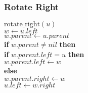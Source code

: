 \documentclass{beamer}
\newcommand{\eq}{=}
\begin{document}
\begin{frame}[shrink]
\frametitle{Rotate Right}
\begin{flushleft}
\hspace*{1em} \ensuremath{\mathrm{rotate\_right}(\ensuremath{\mathit{u}})}\\
\hspace*{1em} \hspace*{1em} \ensuremath{\ensuremath{\mathit{w}} \gets  \ensuremath{\ensuremath{\mathit{u}}.left}}\\
\hspace*{1em} \hspace*{1em} \ensuremath{\ensuremath{\mathit{w}}.\ensuremath{parent} \gets  \ensuremath{\ensuremath{\mathit{u}}.parent}}\\
\hspace*{1em} \hspace*{1em} {\color{black} \textbf{if}} \ensuremath{\ensuremath{\mathit{w}}.\ensuremath{\mathit{parent}} \ne nil} {\color{black} \textbf{then}} \\
\hspace*{1em} \hspace*{1em} \hspace*{1em} {\color{black} \textbf{if}} \ensuremath{\ensuremath{\mathit{w}}.\ensuremath{\mathit{parent}}.\ensuremath{\mathit{left}} \eq u} {\color{black} \textbf{then}} \\
\hspace*{1em} \hspace*{1em} \hspace*{1em} \hspace*{1em} \ensuremath{\ensuremath{\mathit{w}}.\ensuremath{\ensuremath{\mathit{parent}}.left} \gets  \ensuremath{w}}\\
\hspace*{1em} \hspace*{1em} \hspace*{1em} {\color{black} \textbf{else}} \\
\hspace*{1em} \hspace*{1em} \hspace*{1em} \hspace*{1em} \ensuremath{\ensuremath{\mathit{w}}.\ensuremath{\ensuremath{\mathit{parent}}.right} \gets  \ensuremath{w}}\\
\hspace*{1em} \hspace*{1em} \ensuremath{\ensuremath{\mathit{u}}.\ensuremath{left} \gets  \ensuremath{\ensuremath{\mathit{w}}.right}}\\

\end{flushleft}
\end{frame}
\end{document}
